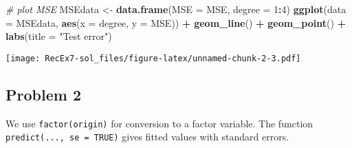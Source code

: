 \documentclass[
]{article}
\newenvironment{Shaded}{\begin{snugshade}}{\end{snugshade}}
\newcommand{\AttributeTok}[1]{\textcolor[rgb]{0.13,0.29,0.53}{#1}}
\newcommand{\CommentTok}[1]{\textcolor[rgb]{0.56,0.35,0.01}{\textit{#1}}}
\newcommand{\DecValTok}[1]{\textcolor[rgb]{0.00,0.00,0.81}{#1}}
\newcommand{\FunctionTok}[1]{\textcolor[rgb]{0.13,0.29,0.53}{\textbf{#1}}}
\newcommand{\NormalTok}[1]{#1}
\newcommand{\OtherTok}[1]{\textcolor[rgb]{0.56,0.35,0.01}{#1}}
\newcommand{\SpecialCharTok}[1]{\textcolor[rgb]{0.81,0.36,0.00}{\textbf{#1}}}
\newcommand{\StringTok}[1]{\textcolor[rgb]{0.31,0.60,0.02}{#1}}
\begin{document}
\begin{Shaded}
\begin{Highlighting}[]
\CommentTok{\# plot MSE}
\NormalTok{MSEdata }\OtherTok{\textless{}{-}} \FunctionTok{data.frame}\NormalTok{(}\AttributeTok{MSE =}\NormalTok{ MSE, }\AttributeTok{degree =} \DecValTok{1}\SpecialCharTok{:}\DecValTok{4}\NormalTok{)}
\FunctionTok{ggplot}\NormalTok{(}\AttributeTok{data =}\NormalTok{ MSEdata, }\FunctionTok{aes}\NormalTok{(}\AttributeTok{x =}\NormalTok{ degree, }\AttributeTok{y =}\NormalTok{ MSE)) }\SpecialCharTok{+}
  \FunctionTok{geom\_line}\NormalTok{() }\SpecialCharTok{+}
  \FunctionTok{geom\_point}\NormalTok{() }\SpecialCharTok{+}
  \FunctionTok{labs}\NormalTok{(}\AttributeTok{title =} \StringTok{"Test error"}\NormalTok{)}
\end{Highlighting}
\end{Shaded}

\texttt{[image: RecEx7-sol\_files/figure-latex/unnamed-chunk-2-3.pdf]}

\hypertarget{problem-2}{%
\subsection{Problem 2}\label{problem-2}}

We use \texttt{factor(origin)} for conversion to a factor variable. The
function \texttt{predict(...,\ se\ =\ TRUE)} gives fitted values with
standard errors.
\end{document}

